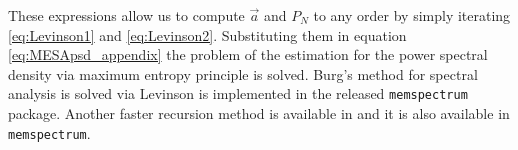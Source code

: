 \documentclass{aa}
\begin{document}
\begin{appendix}
These expressions allow us to compute $\vec a$ and $P_N$ to any order by simply iterating \eqref{eq:Levinson1} and \eqref{eq:Levinson2}. Substituting them in equation \eqref{eq:MESApsd_appendix} the problem of the estimation for the power spectral density via maximum entropy principle is solved.
Burg's method for spectral analysis is solved via Levinson is implemented in the released \texttt{memspectrum} package.
Another faster recursion method is available in \citet{Vos} and it is also available in \texttt{memspectrum}.
\end{appendix}
\end{document}
